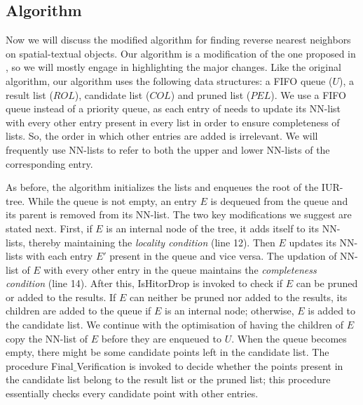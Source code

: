 \documentclass[prodmode,letterpaper]{acmsmall}
\begin{document}
\subsection{Algorithm}
Now we will discuss the modified algorithm for finding reverse nearest neighbors on
spatial-textual objects. Our algorithm is a modification of the one proposed in
\cite{lu2011reverse}, so we will mostly engage in highlighting the major changes.
Like the original algorithm, our algorithm uses the following data structures: a FIFO queue ($U$), a result
list ($ROL$), candidate list ($COL$) and pruned list ($PEL$). We use a FIFO
queue instead of a priority queue, as each entry of needs to update its
NN-list with every other entry present in every list  in order to
ensure completeness of lists. So, the order in which other entries are added is
irrelevant. We will frequently use NN-lists to refer to both the upper and lower
NN-lists of the corresponding entry.

As before, the algorithm initializes the lists and enqueues the root of the IUR-tree.
While the queue is not empty, an entry $E$ is dequeued from the queue and its
parent is removed from its NN-list. The two key modifications we suggest are
stated next. First, if $E$ is an internal node of the tree, it
adds itself to its NN-lists, thereby maintaining the {\em locality condition}
(line 12).
Then $E$ updates its NN-lists with each entry $E'$ present in the queue and vice
versa. The updation of NN-list of $E$ with every other entry in the queue
maintains the {\em completeness condition} (line 14). After this, IsHitorDrop is invoked to check if $E$ can
be pruned or added to the results. If $E$ can neither be pruned nor added to the
results, its children are added to the queue if $E$ is an internal node;
otherwise, $E$ is added to the candidate list. We continue with the optimisation
of having the children of $E$ copy the NN-list of $E$ before they are enqueued to $U$.
When the queue
becomes empty, there might be some candidate points left in the candidate list.
The procedure Final$\_$Verification is invoked to decide whether the points
present in the candidate list belong to the result list or the pruned list; this
procedure essentially checks every candidate point with other entries.
\end{document}
